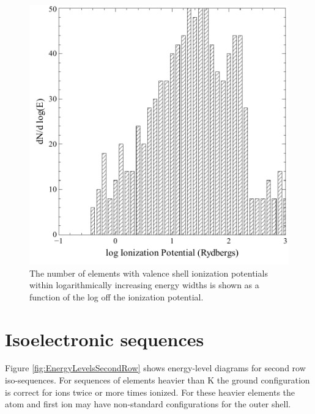\begin{figure}
\centering
\includegraphics{IonizationPotentials}
\caption[Ionization potentials of the elements]{The number of elements with valence shell ionization potentials
within logarithmically increasing energy widths is shown as a function of
the log off the ionization potential.}
\label{fig:IonizationPotentials}
\end{figure}

\section{Isoelectronic sequences}

Figure \ref{fig:EnergyLevelsSecondRow} shows energy-level diagrams for second row iso-sequences.  For
sequences of elements heavier than K the ground configuration is correct
for ions twice or more times ionized.  For these heavier elements the atom
and first ion may have non-standard configurations for the outer shell.

